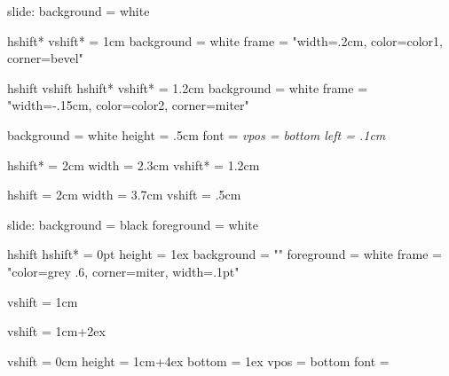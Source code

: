 \endslide










\setparameter slide:
  background = white

  hshift* vshift* = 1cm
  background      = white
  frame           = "width=.2cm, color=color1, corner=bevel"

  hshift vshift hshift* vshift* = 1.2cm
  background                    = white
  frame                         = "width=-.15cm, color=color2, corner=miter"

  background = white
  height     = .5cm
  font       = \it
  vpos       = bottom
  left       = .1cm  

  hshift* = 2cm
  width   = 2.3cm
  vshift* = 1.2cm
  
  hshift  = 2cm
  width   = 3.7cm
  vshift  = .5cm

\newsymbol{}
\newsymbol{}

\endslide













\setparameter slide:
  background = black
  foreground = white

  hshift hshift* = 0pt
  height         = 1ex
  background     = ""
  foreground     = white
  frame          = "color=grey .6, corner=miter, width=.1pt"

  vshift = 1cm

  vshift = 1cm+2ex

  vshift = 0cm
  height = 1cm+4ex
  bottom = 1ex
  vpos   = bottom
  font   = \bf
  
\newsymbol{}

